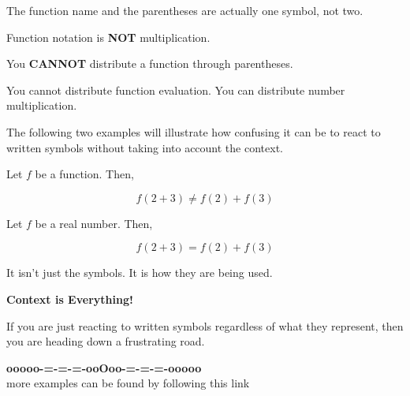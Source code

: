 \documentclass{ximera}
\begin{document}
The function name and the parentheses are actually one symbol, not two. 


\begin{warning}

Function notation is \textbf{\textcolor{red!70!black}{NOT}} multiplication. 

You \textbf{\textcolor{red!70!black}{CANNOT}} distribute a function through parentheses.



\end{warning}

You cannot distribute function evaluation. You can distribute number multiplication. 


The following two examples will illustrate how confusing it can be to react to written symbols without taking into account the context.  











\begin{example}


Let $f$ be a function.  Then, 


\[
f(2 + 3) \ne f(2) + f(3)
\]


\end{example}





\begin{example}


Let $f$ be a real number.  Then, 


\[
f(2 + 3) = f(2) + f(3)
\]


\end{example}


It isn't just the symbols.  It is how they are being used. 

\begin{center}
\textbf{\textcolor{red!70!black}{Context is Everything!}}
\end{center}

If you are just reacting to written symbols regardless of what they represent, then you are heading down a frustrating road.





\begin{center}
\textbf{\textcolor{green!50!black}{ooooo-=-=-=-ooOoo-=-=-=-ooooo}} \\

more examples can be found by following this link\\ 

\end{center}
\end{document}
